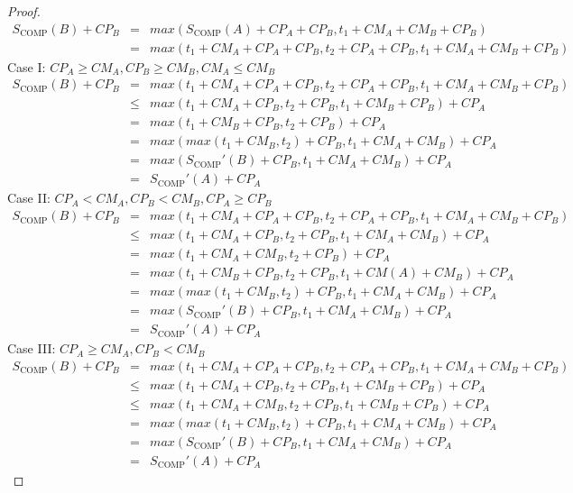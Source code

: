 \documentclass[sigconf]{acmart}
\newcommand{\scomp}{\ensuremath{{S}_{\text{COMP}}}}
\begin{document}
\begin{proof}
		\begin{eqnarray*}
			\scomp(B) + CP_B & = & max(\scomp(A) + CP_A + CP_B,  t_1 + CM_A + CM_B + CP_B)\\
			& = & max(t_1 + CM_A + CP_A + CP_B, t_2 + CP_A + CP_B, t_1 + CM_A + CM_B + CP_B) 
		\end{eqnarray*}
		Case I: $CP_A \ge CM_A, CP_B \ge CM_B, CM_A \le CM_B$
		\begin{eqnarray*}
			\scomp(B) + CP_B & = & max(t_1 + CM_A + CP_A + CP_B, t_2 + CP_A + CP_B, t_1 + CM_A + CM_B + CP_B)\\
			& \le& max(t_1 + CM_A + CP_B, t_2  + CP_B, t_1  + CM_B + CP_B) + CP_A\\
			& = & max( t_1  + CM_B + CP_B, t_2  + CP_B) + CP_A \\
			& = & max(max(t_1 + CM_B, t_2) + CP_B, t_1 + CM_A + CM_B) + CP_A\\
			& = & max(\scomp'(B) + CP_B, t_1 + CM_A + CM_B) + CP_A \\
			& = & \scomp'(A) + CP_A
		\end{eqnarray*}
		Case II: $CP_A < CM_A, CP_B < CM_B, CP_A \ge CP_B$
		\begin{eqnarray*}
			\scomp(B) + CP_B & = & max(t_1 + CM_A + CP_A + CP_B, t_2 + CP_A + CP_B, t_1 + CM_A + CM_B + CP_B)\\
			& \le & max(t_1 + CM_A + CP_B, t_2+CP_B, t_1 + CM_A + CM_B) + CP_A\\
			& = & max(t_1 + CM_A + CM_B, t_2+ CP_B) + CP_A \\
			& = & max(t_1 + CM_B + CP_B, t_2 + CP_B, t_1 + CM(A) + CM_B) + CP_A \\
			& = & max(max(t_1 + CM_B, t_2) + CP_B, t_1 + CM_A + CM_B) + CP_A \\
			& = & max(\scomp'(B) + CP_B, t_1 + CM_A +CM_B) + CP_A \\
			& = & \scomp'(A) + CP_A
		\end{eqnarray*}
		Case III: $CP_A \ge CM_A, CP_B < CM_B$
		\begin{eqnarray*}
			\scomp(B) + CP_B & = & max(t_1 + CM_A + CP_A + CP_B, t_2 + CP_A + CP_B, t_1 + CM_A + CM_B + CP_B)\\
			& \le & max(t_1 + CM_A + CP_B, t_2 + CP_B, t_1 + CM_B + CP_B) + CP_A\\
			& \le & max(t_1 + CM_A + CM_B, t_2 + CP_B, t_1 + CM_B + CP_B) + CP_A \\
			& = & max(max(t_1 + CM_B, t_2) + CP_B, t_1 + CM_A + CM_B) + CP_A \\
			& = & max(\scomp'(B) + CP_B, t_1 + CM_A +CM_B) + CP_A \\
			& = & \scomp'(A) + CP_A
		\end{eqnarray*}
	\end{proof}
	
\end{document}
